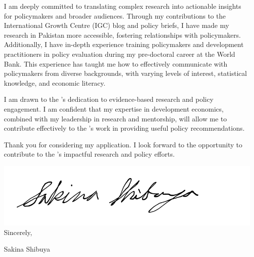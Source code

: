 \documentclass[12pt]{letter}
\begin{document}
I am deeply committed to translating complex research into actionable insights for policymakers and broader audiences. 
Through my contributions to the International Growth Centre (IGC) blog and policy briefs, I have made my research in Pakistan more accessible, 
fostering relationships with policymakers. Additionally, I have in-depth experience training policymakers and development practitioners 
in policy evaluation during my pre-doctoral career at the World Bank. This experience has taught me how to effectively communicate 
with policymakers from diverse backgrounds, with varying levels of interest, statistical knowledge, and economic literacy.

I am drawn to the \instName's dedication to evidence-based research and policy engagement. I am confident that my expertise 
in development economics, combined with my leadership in research and mentorship, will allow me to contribute effectively 
to the \instName's work in providing useful policy recommendations.

Thank you for considering my application. I look forward to the opportunity to contribute to the \instName's 
impactful research and policy efforts.

\bigskip

\includegraphics[height=4\baselineskip]{signature.png}  \\

\vspace*{-6.5\baselineskip}Sincerely, 

\vspace{2.5\baselineskip}Sakina Shibuya
\end{document}
